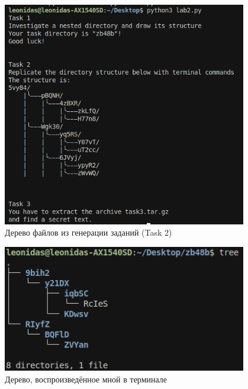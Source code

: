 \begin{figure}[H]
  \centering
  \includegraphics[width=0.95\textwidth]{images/image.png}
  \caption{Дерево файлов из генерации заданий (Task 2)}
  \label{fig:gen_tree}
\end{figure}

\begin{figure}[H]
  \centering
  \includegraphics[width=0.95\textwidth]{images/image2.png}
  \caption{Дерево, воспроизведённое мной в терминале}
  \label{fig:my_tree}
\end{figure}






